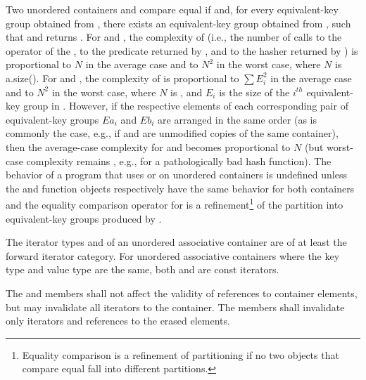 \pnum
Two unordered containers  and  compare equal if
 and, for every equivalent-key group
 obtained from , there exists an
equivalent-key group  obtained from ,
such that  and
 returns . For
 and , the complexity of
 (i.e., the number of calls to the \tcode{==} operator
of the , to the predicate returned by ,
and to the hasher returned by ) is proportional to
$N$ in the average case and to $N^2$ in the worst case, where $N$ is
a.size(). For  and ,
the complexity of  is proportional to $\sum E_i^2$
in the average case and to $N^2$ in the worst case, where $N$ is ,
and $E_i$ is the size of the $i^{th}$ equivalent-key group in .
However, if the respective elements of each corresponding pair of
equivalent-key groups $Ea_i$ and $Eb_i$ are arranged in the same order
(as is commonly the case, e.g., if  and  are unmodified copies
of the same container), then the average-case complexity for
 and  becomes
proportional to $N$ (but worst-case complexity remains , e.g., for
a pathologically bad hash function). The behavior of a program that uses
 or  on unordered containers is undefined
unless the  and  function objects respectively have
the same behavior for both containers and the equality comparison operator
for  is a refinement\footnote{Equality comparison is a refinement
of partitioning if no two objects that
compare equal fall into different partitions.}
of the partition into equivalent-key groups produced by .

\pnum
{}%
The iterator types  and  of
an unordered associative container are of at least the forward iterator
category.  For unordered associative containers where the key type and
value type are the same, both  and
 are const iterators.

\pnum
{}%
The  and  members shall not affect the validity of references to
container elements, but may invalidate all iterators to the
container.  The  members shall invalidate only iterators and
references to the erased elements.

